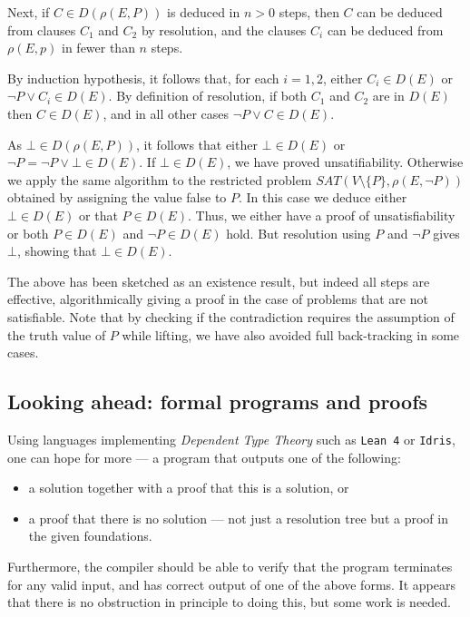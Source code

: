 Next, if \(C \in D(\rho(E, P))\) is deduced in \(n > 0\) steps, then
\(C\) can be deduced from clauses \(C_1\) and \(C_2\) by resolution, and
the clauses \(C_i\) can be deduced from \(\rho(E, p)\) in fewer than
\(n\) steps.

By induction hypothesis, it follows that, for each \(i =1, 2\), either
\(C_i \in D(E)\) or \(\neg P\vee C_i\in D(E)\). By definition of
resolution, if both \(C_1\) and \(C_2\) are in \(D(E)\) then
\(C\in D(E)\), and in all other cases \(\neg P\vee C\in D(E)\).

As \(\bot \in D(\rho(E, P))\), it follows that either \(\bot\in D(E)\)
or \(\neg P = \neg P\vee \bot \in D(E)\). If \(\bot\in D(E)\), we have
proved unsatifiability. Otherwise we apply the same algorithm to the
restricted problem \(SAT(V \setminus \{P\}, \rho(E, \neg P))\) obtained
by assigning the value false to \(P\). In this case we deduce either
\(\bot\in D(E)\) or that \(P\in D(E)\). Thus, we either have a proof of
unsatisfiability or both \(P\in D(E)\) and \(\neg P\in D(E)\) hold. But
resolution using \(P\) and \(\neg P\) gives \(\bot\), showing that
\(\bot\in D(E)\).

The above has been sketched as an existence result, but indeed all steps
are effective, algorithmically giving a proof in the case of problems
that are not satisfiable. Note that by checking if the contradiction
requires the assumption of the truth value of \(P\) while lifting, we
have also avoided full back-tracking in some cases.

\hypertarget{looking-ahead-formal-programs-and-proofs}{%
\subsection{Looking ahead: formal programs and
proofs}\label{looking-ahead-formal-programs-and-proofs}}

Using languages implementing \emph{Dependent Type Theory} such as
\texttt{Lean\ 4} or \texttt{Idris}, one can hope for more --- a program
that outputs one of the following:

\begin{itemize}
\tightlist
\item
  a solution together with a proof that this is a solution, or
\item
  a proof that there is no solution --- not just a resolution tree but a
  proof in the given foundations.
\end{itemize}

Furthermore, the compiler should be able to verify that the program
terminates for any valid input, and has correct output of one of the
above forms. It appears that there is no obstruction in principle to
doing this, but some work is needed.
